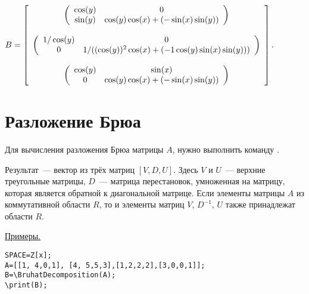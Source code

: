 {$B = \left[\begin{array}{c}
\mtr{\cos(y)}{0}{\sin(y)}{\cos(y)\cos(x)+(-\sin(x)\sin(y))}\\
\null \\
\mtr{1/\cos(y)}{0}{0}{1/((\cos(y))^2\cos(x)+(-1\cos(y)\sin(x)\sin(y)))}\\
\null \\
\mtr{\cos(y)}{\sin(x)}{0}{\cos(y)\cos(x)+(-\sin(x)\sin(y))}\\
 \end{array}\right].$}

\section{Разложение Брюа}
Для вычисления разложения Брюа матрицы $A$, нужно выполнить команду 
 . 

Результат~--- вектор из трёх матриц $[V,D,U]$. Здесь  $V$ и $U$~--- верхние треугольные матрицы, 
$D$~--- матрица перестановок, умноженная на матрицу, которая является обратной к диагональной матрице. Если элементы матрицы $A$ из коммутативной области $R$, то и элементы матриц $V$, $D^{-1}$, $U$ также принадлежат области $R$.


\underline{Примеры. }

\vspace*{-2mm}
\begin{verbatim}
SPACE=Z[x]; 
A=[[1, 4,0,1], [4, 5,5,3],[1,2,2,2],[3,0,0,1]];
B=\BruhatDecomposition(A);
\print(B);
\end{verbatim}

